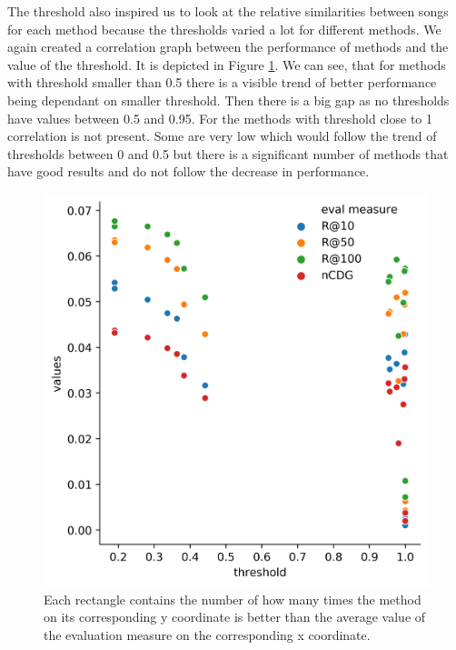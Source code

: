 The threshold also inspired us to look at the relative similarities between songs for each method because the thresholds varied a lot for different methods. We again created a correlation graph between the performance of methods and the value of the threshold. It is depicted in Figure \ref{fig:threshold_correlation_graph}. We can see, that for methods with threshold smaller than 0.5 there is a visible trend of better performance being dependant on smaller threshold. Then there is a big gap as no thresholds have values between 0.5 and 0.95. For the methods with threshold close to 1 correlation is not present. Some are very low which would follow the trend of thresholds between 0 and 0.5 but there is a significant number of methods that have good results and do not follow the decrease in performance.

\begin{figure}[h]
    \centering
	\includegraphics[width=1\linewidth]{./img/nn_threshold_performance_correlation.png}
	\caption{Each rectangle contains the number of how many times the method on its corresponding y coordinate is better than the average value of the evaluation measure on the corresponding x coordinate.}
	\label{fig:threshold_correlation_graph}
\end{figure}




